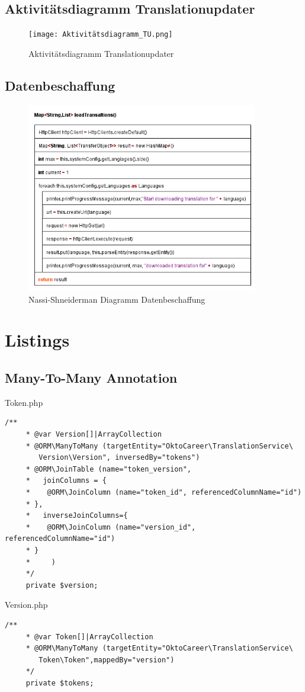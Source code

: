 \documentclass[10pt, oneside, ngerman]{article}
\begin{document}
  \subsection{Aktivitätsdiagramm Translationupdater}\label{sec:activ}
  \begin{figure}[htb]
    \centering
    \texttt{[image: Aktivitätsdiagramm\_TU.png]}
    \caption{Aktivitätsdiagramm Translationupdater}
  \end{figure}
  \newpage
  \subsection{Datenbeschaffung}\label{sec:impl:algo:load}
  \begin{figure}[ht]
    \centering
    \includegraphics[width=0.9\textwidth]{Beschaffungsalgorithmus.PNG}
    \caption{Nassi-Shneiderman Diagramm Datenbeschaffung}
  \end{figure}
  \newpage
  \section{Listings}
  \subsection{Many-To-Many Annotation}\label{sec:lst:mtmA}
    Token.php
  \begin{lstlisting}[caption={ManyToMany mit Doctrine}, captionpos=b]
    /**
     * @var Version[]|ArrayCollection
     * @ORM\ManyToMany (targetEntity="OktoCareer\TranslationService\
        Version\Version", inversedBy="tokens")
     * @ORM\JoinTable (name="token_version",
     *   joinColumns = {
     *    @ORM\JoinColumn (name="token_id", referencedColumnName="id")
     * },
     *   inverseJoinColumns={
     *    @ORM\JoinColumn (name="version_id", referencedColumnName="id")
     * }
     *     )
     */
     private $version;
  \end{lstlisting}
  Version.php
  \begin{lstlisting}[caption={Many To Many mit Doctrine}, captionpos=b]
    /**
     * @var Token[]|ArrayCollection
     * @ORM\ManyToMany (targetEntity="OktoCareer\TranslationService\
        Token\Token",mappedBy="version")
     */
     private $tokens;
  \end{lstlisting}
\end{document}
